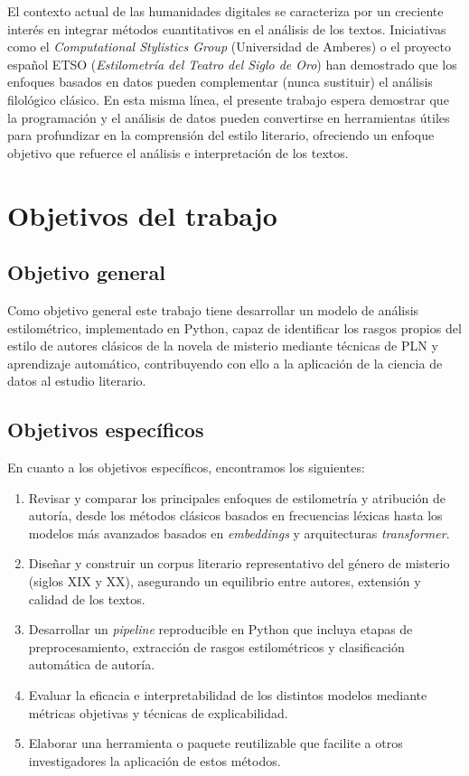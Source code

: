 \documentclass[IB]{TFUOC}%
\begin{document}
El contexto actual de las humanidades digitales se caracteriza por un creciente interés en integrar métodos cuantitativos en el análisis de los textos. Iniciativas como el \textit{Computational Stylistics Group}\cite{computationalstylistics2025} (Universidad de Amberes) o el proyecto español ETSO\cite{gonzalez2017etso} (\textit{Estilometría del Teatro del Siglo de Oro}) han demostrado que los enfoques basados en datos pueden complementar (nunca sustituir) el análisis filológico clásico. En esta misma línea, el presente trabajo espera demostrar que la programación y el análisis de datos pueden convertirse en herramientas útiles para profundizar en la comprensión del estilo literario, ofreciendo un enfoque objetivo que refuerce el análisis e interpretación de los textos.

\section{Objetivos del trabajo}

\subsection{Objetivo general}

Como objetivo general este trabajo tiene desarrollar un modelo de análisis estilométrico, implementado en Python, capaz de identificar los rasgos propios del estilo de autores clásicos de la novela de misterio mediante técnicas de PLN y aprendizaje automático, contribuyendo con ello a la aplicación de la ciencia de datos al estudio literario.

\subsection{Objetivos específicos}

En cuanto a los objetivos específicos, encontramos los siguientes:

\begin{enumerate}
	\item Revisar y comparar los principales enfoques de estilometría y atribución de autoría, desde los métodos clásicos basados en frecuencias léxicas hasta los modelos más avanzados basados en \textit{embeddings} y arquitecturas \textit{transformer}.
	\item Diseñar y construir un corpus literario representativo del género de misterio (siglos XIX y XX), asegurando un equilibrio entre autores, extensión y calidad de los textos.
	\item Desarrollar un \textit{pipeline} reproducible en Python que incluya etapas de preprocesamiento, extracción de rasgos estilométricos y clasificación automática de autoría.
	\item Evaluar la eficacia e interpretabilidad de los distintos modelos mediante métricas objetivas y técnicas de explicabilidad.
	\item Elaborar una herramienta o paquete reutilizable que facilite a otros investigadores la aplicación de estos métodos.
\end{enumerate}
\end{document}
